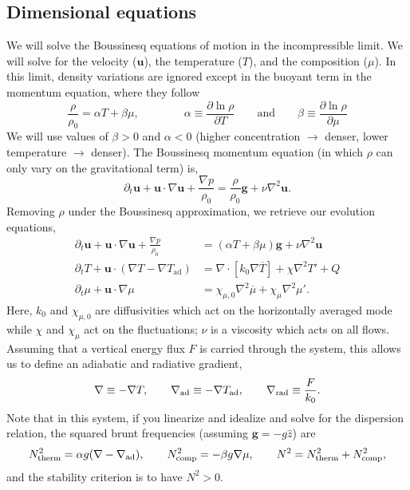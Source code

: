 \documentclass[onecolumn, amsmath, amsfonts, amssymb]{aastex62}
\newcommand{\grad}{\ensuremath{\nabla}}
\renewcommand{\bar}[1]{\ensuremath{\overline{#1}}}
\renewcommand{\vec}[1]{\ensuremath{\mathbf{#1}}}
\renewcommand{\dot}{\ensuremath{\cdot}}
\begin{document}
\subsection{Dimensional equations}
We will solve the Boussinesq equations of motion in the incompressible limit.
We will solve for the velocity (\vec{u}), the temperature ($T$), and the composition ($\mu$).
In this limit, density variations are ignored except in the buoyant term in the momentum equation, where they follow
\begin{equation}
\frac{\rho}{\rho_0} = \alpha T + \beta \mu,\qquad\qquad
\alpha \equiv \frac{\partial\ln\rho}{\partial T} \qquad\mathrm{and}\qquad
\beta  \equiv \frac{\partial\ln\rho}{\partial \mu}
\end{equation}
We will use values of $\beta > 0$ and $\alpha < 0$ (higher concentration $\rightarrow$ denser, lower temperature $\rightarrow$ denser).
The Boussinesq momentum equation (in which $\rho$ can only vary on the gravitational term) is,
\begin{equation}
\partial_t \vec{u} + \vec{u}\dot\grad\vec{u} + \frac{\grad p}{\rho_0} = \frac{\rho}{\rho_0}\vec{g} + \nu\grad^2\bm{u}.
\end{equation}
Removing $\rho$ under the Boussinesq approximation, we retrieve our evolution equations,
\begin{align}
\partial_t \vec{u} + \vec{u}\dot\grad\vec{u} + \frac{\grad p}{\rho_0} &= (\alpha T + \beta \mu)\vec{g} + \nu \grad^2\vec{u} \\
    \partial_t T + \vec{u}\dot(\grad T - \grad T_{\mathrm{ad}}) &= \grad\dot[k_0 \grad \bar{T}] + \chi \grad^2 T' + Q \label{eqn:temperature_eqn} \\
    \partial_t \mu + \vec{u}\dot\grad \mu &= \chi_{\mu,0} \grad^2 \bar{\mu} + \chi_{\mu} \grad^2 \mu' .
\end{align}
Here, $k_0$ and $\chi_{\mu,0}$ are diffusivities which act on the horizontally averaged mode while $\chi$ and $\chi_\mu$ act on the fluctuations; $\nu$ is a viscosity which acts on all flows.
Assuming that a vertical energy flux $F$ is carried through the system, this allows us to define an adiabatic and radiative gradient,
\begin{equation}
    \grad \equiv - \grad T, \qquad
    \grad_{\rm{ad}} \equiv - \grad T_{\rm{ad}}, \qquad
    \grad_{\rm{rad}} \equiv \frac{F}{k_0}.
\end{equation}
Note that in this system, if you linearize and idealize and solve for the dispersion relation, the squared brunt frequencies (assuming $\vec{g} = - g \hat{z}$) are
\begin{equation}
    N_{\mathrm{therm}}^2 = \alpha g (\grad - \grad_{\rm{ad}}), \qquad
    N_{\mathrm{comp}}^2 =  -\beta  g \grad \mu, \qquad
    N^2 = N_{\mathrm{therm}}^2 + N_{\mathrm{comp}}^2,
\end{equation}
and the stability criterion is to have $N^2 > 0$.
\end{document}
